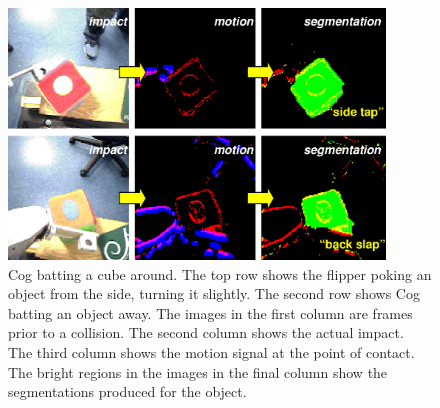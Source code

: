 %
\begin{figure}[tb]
\begin{center}
\includegraphics[width=10cm]{fig-poke-batting.eps}
\caption{ 
\label{fig:poking-segmentation}
%
Cog batting a cube around.  The top row shows the flipper poking
an object from the side, turning it slightly.  The second
row shows Cog batting an object away.  The images in the first column
are frames prior to a collision.  The second column shows the actual
impact.  The third column shows the motion signal at the point of
contact.  The bright regions in the images in the final column show
the segmentations produced for the object. 
%
}
\end{center}
\end{figure}
%

